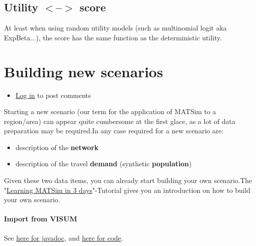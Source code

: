 \documentclass[a4paper,11pt]{report}
\begin{document}
\vfill\eject
\section{Utility $<$--$>$ score}



At least when using random utility models (such as multinomial logit   aka ExpBeta...), the score has the same function as the deterministic   utility.

\chapter{Building new scenarios}
\begin{itemize}
	\item \href{http://www.matsim.org/user/login?destination=comment/reply/144%23comment-form}{Log in} to post comments
\end{itemize}

Starting  a new scenario (our term for the application of MATSim to a  region/area) can appear quite cumbersome at the first glace, as a lot of  data preparation may be required.In any case required for a new  scenario are:
\begin{itemize}
	\item description of the \textbf{network}
	\item description of the travel \textbf{demand} (synthetic \textbf{population})
\end{itemize}

Given these two data items, you can already start building your own scenario.The "\href{http://www.matsim.org/docs/tutorials/learningIn3days}{Learning MATSim in 3 days}"-Tutorial gives you an introduction on how to build your own scenario.

\subsubsection{Import from VISUM}

See \href{http://matsim.org/javadoc/org/matsim/visum/package-summary.html}{here for javadoc}, and \href{http://matsim.org/xref/org/matsim/visum/package-summary.html}{here for code}.
\end{document}
